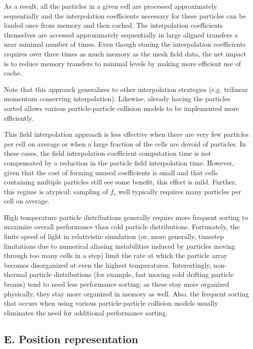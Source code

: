 \documentclass[letter,10pt]{article}
\begin{document}
As a result, all the particles in a given cell are processed
approximately sequentially and the interpolation coefficients
necessary for these particles can be loaded once from memory and then
cached.  The interpolation coefficients themselves are accessed
approximately sequentially in large aligned transfers a near minimal
number of times.  Even though storing the interpolation coefficients
requires over three times as much memory as the mesh field data, the
net impact is to reduce memory transfers to minimal levels by making
more efficient use of cache.

Note that this approach generalizes to other interpolation strategies
(e.g. trilinear momentum conserving interpolation).  Likewise, already
having the particles sorted allows various particle-particle
collision models to be implemented more efficiently.  

This field interpolation approach is less effective when there are
very few particles per cell on average or when a large fraction of the
cells are devoid of particles.  In these cases, the field
interpolation coefficient computation time is not compensated by a
reduction in the particle field interpolation time.  However, given
that the cost of forming unused coefficients is small and that cells
containing multiple particles still see some benefit, this effect is
mild.  Further, this regime is atypical; sampling of $f_s$ well
typically requires many particles per cell on average.

High temperature particle distributions generally require more
frequent sorting to maximize overall performance than cold particle
distributions.  Fortunately, the finite speed of light in relativistic
simulation (or, more generally, timestep limitations due to numerical
aliasing instabilities induced by particles moving through too many
cells in a step) limit the rate at which the particle array becomes
disorganized at even the highest temperatures.  Interestingly,
non-thermal particle distributions (for example, fast moving cold
drifting particle beams) tend to need less performance sorting; as
these stay more organized physically, they stay more organized in
memory as well.  Also, the frequent sorting that occurs when using
various particle-particle collision models usually eliminates the need
for additional performance sorting.

\subsection{E. Position representation}
\end{document}
